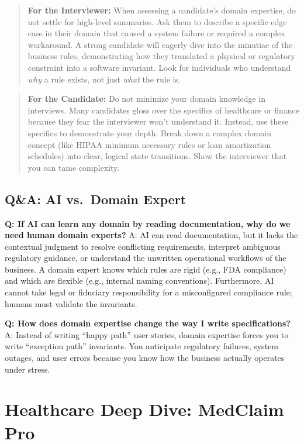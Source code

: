 \begin{quote}
\textbf{For the Interviewer:} When assessing a candidate's domain
expertise, do not settle for high-level summaries. Ask them to describe
a specific edge case in their domain that caused a system failure or
required a complex workaround. A strong candidate will eagerly dive into
the minutiae of the business rules, demonstrating how they translated a
physical or regulatory constraint into a software invariant. Look for
individuals who understand \emph{why} a rule exists, not just
\emph{what} the rule is.
\end{quote}

\begin{quote}
\textbf{For the Candidate:} Do not minimize your domain knowledge in
interviews. Many candidates gloss over the specifics of healthcare or
finance because they fear the interviewer won't understand it. Instead,
use these specifics to demonstrate your depth. Break down a complex
domain concept (like HIPAA minimum necessary rules or loan amortization
schedules) into clear, logical state transitions. Show the interviewer
that you can tame complexity.
\end{quote}

\subsection{Q\&A: AI vs.~Domain Expert}\label{qa-ai-vs.-domain-expert}

\textbf{Q: If AI can learn any domain by reading documentation, why do
we need human domain experts?} A: AI can read documentation, but it
lacks the contextual judgment to resolve conflicting requirements,
interpret ambiguous regulatory guidance, or understand the unwritten
operational workflows of the business. A domain expert knows which rules
are rigid (e.g., FDA compliance) and which are flexible (e.g., internal
naming conventions). Furthermore, AI cannot take legal or fiduciary
responsibility for a misconfigured compliance rule; humans must validate
the invariants.

\textbf{Q: How does domain expertise change the way I write
specifications?} A: Instead of writing ``happy path'' user stories,
domain expertise forces you to write ``exception path'' invariants. You
anticipate regulatory failures, system outages, and user errors because
you know how the business actually operates under stress.

\bigskip

\section{Healthcare Deep Dive: MedClaim
Pro}\label{healthcare-deep-dive-medclaim-pro}

